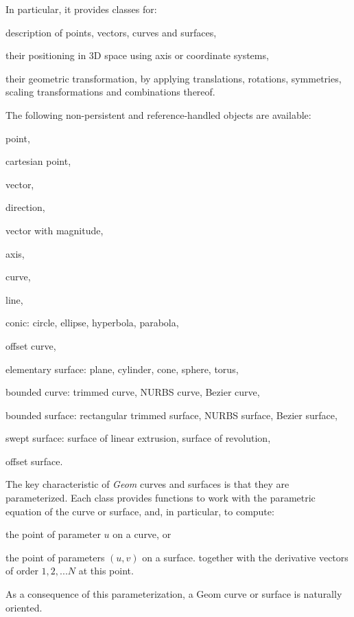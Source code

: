In particular, it provides classes for\+:
\begin{DoxyItemize}
\item description of points, vectors, curves and surfaces,
\item their positioning in 3D space using axis or coordinate systems,
\item their geometric transformation, by applying translations, rotations, symmetries, scaling transformations and combinations thereof.
\end{DoxyItemize}

The following non-\/persistent and reference-\/handled objects are available\+:
\begin{DoxyItemize}
\item point,
\item cartesian point,
\item vector,
\item direction,
\item vector with magnitude,
\item axis,
\item curve,
\item line,
\item conic\+: circle, ellipse, hyperbola, parabola,
\item offset curve,
\item elementary surface\+: plane, cylinder, cone, sphere, torus,
\item bounded curve\+: trimmed curve, N\+U\+R\+BS curve, Bezier curve,
\item bounded surface\+: rectangular trimmed surface, N\+U\+R\+BS surface, Bezier surface,
\item swept surface\+: surface of linear extrusion, surface of revolution,
\item offset surface.
\end{DoxyItemize}

The key characteristic of {\itshape Geom} curves and surfaces is that they are parameterized. Each class provides functions to work with the parametric equation of the curve or surface, and, in particular, to compute\+:
\begin{DoxyItemize}
\item the point of parameter $u$ on a curve, or
\item the point of parameters $(u, v)$ on a surface. together with the derivative vectors of order $1, 2, ... N$ at this point.
\end{DoxyItemize}

As a consequence of this parameterization, a Geom curve or surface is naturally oriented.

